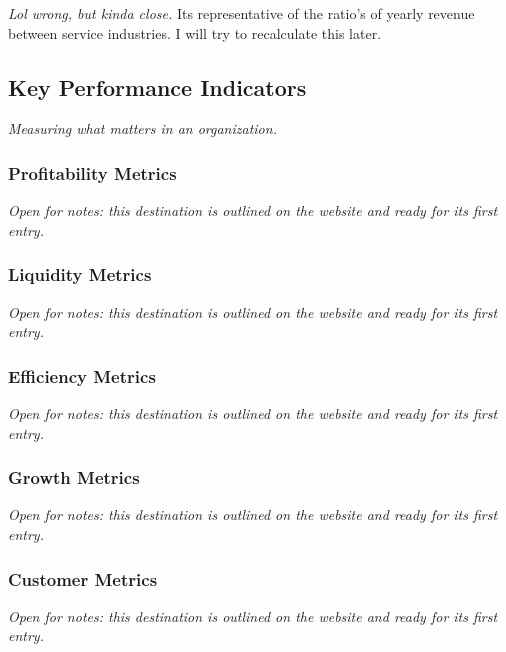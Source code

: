 \documentclass{article}
\begin{document}
\textit{Lol wrong, but kinda close.} Its representative of the ratio's of yearly revenue between service industries. I will try to recalculate this later. 



\newpage

\subsection{Key Performance Indicators}\label{sec:key-performance-indicators}
\textit{Measuring what matters in an organization.}

\subsubsection{Profitability Metrics}\label{sec:profitability-metrics}
\textit{Open for notes: this destination is outlined on the website and ready for its first entry.}

\subsubsection{Liquidity Metrics}\label{sec:liquidity-metrics}
\textit{Open for notes: this destination is outlined on the website and ready for its first entry.}

\subsubsection{Efficiency Metrics}\label{sec:efficiency-metrics}
\textit{Open for notes: this destination is outlined on the website and ready for its first entry.}

\subsubsection{Growth Metrics}\label{sec:growth-metrics}
\textit{Open for notes: this destination is outlined on the website and ready for its first entry.}

\subsubsection{Customer Metrics}\label{sec:customer-metrics}
\textit{Open for notes: this destination is outlined on the website and ready for its first entry.}
\end{document}
